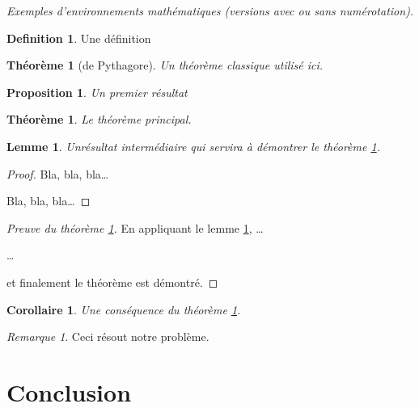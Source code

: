 \documentclass[a4paper,french,11pt]{article}
\newtheorem{theo}{Théorème}
\newtheorem*{theo*}{Théorème}
\newtheorem*{prop*}{Proposition}
\newtheorem{lemme}{Lemme}
\newtheorem{cor}{Corollaire}
\theoremstyle{definition}\newtheorem{defn}{Definition}
\newtheorem*{defn*}{Definition}
\theoremstyle{remark}\newtheorem{rem}{Remarque}
\newtheorem*{rem*}{Remarque}
\newcounter{note}
\newcommand\note[1]{%
	\par\vspace{1ex}
 	\noindent\fboxsep0pt\colorbox{yellow}{\hypertarget{note#1}{\hyperlink{anote#1}{(\ref{note:#1})}}}\ %
}
\begin{document}
\vspace{2ex}

\emph{Exemples d'environnements mathématiques (versions avec ou sans numérotation).}
\begin{defn*} Une définition
\end{defn*}
\begin{theo*}[de Pythagore]
	Un théorème classique utilisé ici.
\end{theo*}
\begin{prop*}
	Un premier résultat
\end{prop*}
\begin{theo}\label{montheo}
	Le théorème principal.
\end{theo}
\begin{lemme}\label{monlemme}
	Unrésultat intermédiaire qui servira à démontrer le théorème \ref{montheo}.
\end{lemme}
\begin{proof}
	Bla, bla, bla\ldots
	
	Bla, bla, bla\ldots
\end{proof}
\begin{proof}[Preuve du théorème \ref{montheo}]
	En appliquant le lemme \ref{monlemme}, \ldots
	
	\ldots
	
	et finalement le théorème est démontré.
\end{proof}
\begin{cor}
	Une conséquence du théorème \ref{montheo}.
\end{cor}
\begin{rem*}
	Ceci résout notre problème.
\end{rem*}


\section{Conclusion}


%
%
 
\end{document}
